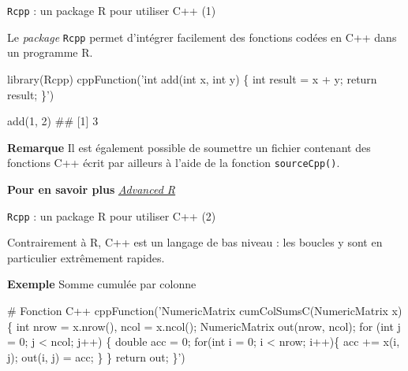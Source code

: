 \documentclass[12pt,handout,ignorenonframetext,]{beamer}
\newenvironment{Shaded}{}{}
\newcommand{\KeywordTok}[1]{\textcolor[rgb]{0.00,0.00,1.00}{{#1}}}
\newcommand{\DecValTok}[1]{{#1}}
\newcommand{\StringTok}[1]{\textcolor[rgb]{0.00,0.50,0.50}{{#1}}}
\newcommand{\CommentTok}[1]{\textcolor[rgb]{0.00,0.50,0.00}{{#1}}}
\newcommand{\NormalTok}[1]{{#1}}
\renewenvironment{Shaded}{\begin{snugshade}}{\end{snugshade}}
\begin{document}
\begin{frame}[fragile]{\texttt{Rcpp} : un package R pour utiliser C++
(1)}

Le \emph{package} \texttt{Rcpp} permet d'intégrer facilement des
fonctions codées en C++ dans un programme R.

\footnotesize

\begin{Shaded}
\begin{Highlighting}[]
\KeywordTok{library}\NormalTok{(Rcpp)}
\KeywordTok{cppFunction}\NormalTok{(}\StringTok{'int add(int x, int y) \{}
\StringTok{  int result = x + y;}
\StringTok{  return result;}
\StringTok{\}'}\NormalTok{)}

\KeywordTok{add}\NormalTok{(}\DecValTok{1}\NormalTok{, }\DecValTok{2}\NormalTok{)}
  \NormalTok{## [1] 3}
\end{Highlighting}
\end{Shaded}

\normalsize

\textbf{Remarque} Il est également possible de soumettre un fichier
contenant des fonctions C++ écrit par ailleurs à l'aide de la fonction
\texttt{sourceCpp()}.

\textbf{Pour en savoir plus}
\href{http://adv-r.had.co.nz/Rcpp.html}{\underline{\textit{Advanced R}}}

\end{frame}

\begin{frame}[fragile]{\texttt{Rcpp} : un package R pour utiliser C++
(2)}

Contrairement à R, C++ est un langage de bas niveau : les boucles y sont
en particulier extrêmement rapides.

\textbf{Exemple} Somme cumulée par colonne

\footnotesize

\begin{Shaded}
\begin{Highlighting}[]
\CommentTok{# Fonction C++}
\KeywordTok{cppFunction}\NormalTok{(}\StringTok{'NumericMatrix cumColSumsC(NumericMatrix x) \{}
\StringTok{  int nrow = x.nrow(), ncol = x.ncol();}
\StringTok{  NumericMatrix out(nrow, ncol);}
\StringTok{  for (int j = 0; j < ncol; j++) \{}
\StringTok{    double acc = 0;}
\StringTok{    for(int i = 0; i < nrow; i++)\{}
\StringTok{      acc += x(i, j);}
\StringTok{      out(i, j) = acc;}
\StringTok{    \}}
\StringTok{  \}}
\StringTok{  return out;}
\StringTok{\}'}\NormalTok{)}
\end{Highlighting}
\end{Shaded}

\end{frame}
\end{document}
